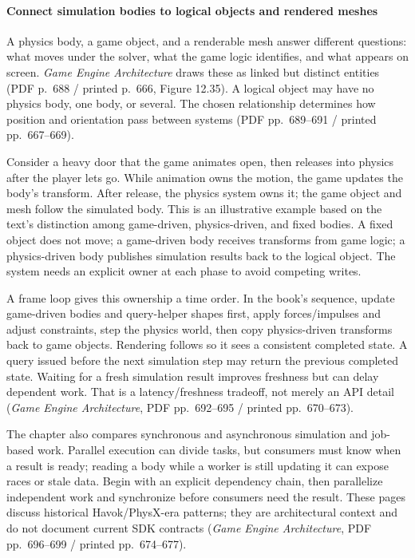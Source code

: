 \paragraph{Connect simulation bodies to logical objects and rendered meshes}\label{connect-simulation-bodies-to-logical-objects-and-rendered-meshes}

A physics body, a game object, and a renderable mesh answer different questions: what moves under the solver, what the game logic identifies, and what appears on screen. \emph{Game Engine Architecture} draws these as linked but distinct entities (PDF p.~688 / printed p.~666, Figure 12.35). A logical object may have no physics body, one body, or several. The chosen relationship determines how position and orientation pass between systems (PDF pp.~689--691 / printed pp.~667--669).

Consider a heavy door that the game animates open, then releases into physics after the player lets go. While animation owns the motion, the game updates the body's transform. After release, the physics system owns it; the game object and mesh follow the simulated body. This is an illustrative example based on the text's distinction among game-driven, physics-driven, and fixed bodies. A fixed object does not move; a game-driven body receives transforms from game logic; a physics-driven body publishes simulation results back to the logical object. The system needs an explicit owner at each phase to avoid competing writes.

A frame loop gives this ownership a time order. In the book's sequence, update game-driven bodies and query-helper shapes first, apply forces/impulses and adjust constraints, step the physics world, then copy physics-driven transforms back to game objects. Rendering follows so it sees a consistent completed state. A query issued before the next simulation step may return the previous completed state. Waiting for a fresh simulation result improves freshness but can delay dependent work. That is a latency/freshness tradeoff, not merely an API detail (\emph{Game Engine Architecture}, PDF pp.~692--695 / printed pp.~670--673).

The chapter also compares synchronous and asynchronous simulation and job-based work. Parallel execution can divide tasks, but consumers must know when a result is ready; reading a body while a worker is still updating it can expose races or stale data. Begin with an explicit dependency chain, then parallelize independent work and synchronize before consumers need the result. These pages discuss historical Havok/PhysX-era patterns; they are architectural context and do not document current SDK contracts (\emph{Game Engine Architecture}, PDF pp.~696--699 / printed pp.~674--677).

